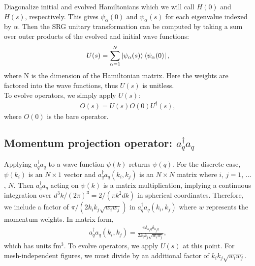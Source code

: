 \documentclass[preprintnumbers,floatfix,aps,prc,preprint,nofootinbib]{revtex4-1}
\begin{document}
Diagonalize initial and evolved Hamiltonians which we will call $H(0)$ and $H(s)$, respectively. This gives $\psi_{\alpha}(0)$ and $\psi_{\alpha}(s)$ for each eigenvalue indexed by $\alpha$. Then the SRG unitary transformation can be computed by taking a sum over outer products of the evolved and initial wave functions:
%
\begin{eqnarray}
	\label{eq:unitary_transformation}
	U(s) = \sum_{\alpha=1}^{N} \ket{\psi_{\alpha}(s)} \bra{\psi_{\alpha}(0)},
\end{eqnarray}
%
where N is the dimension of the Hamiltonian matrix. Here the weights are factored into the wave functions, thus $U(s)$ is unitless.
\\

To evolve operators, we simply apply $U(s)$:
%
\begin{eqnarray}
	\label{eq:evolved_operator}
	O(s) = U(s) O(0) U^{\dagger}(s),
\end{eqnarray}
%
where $O(0)$ is the bare operator.


\subsection{Momentum projection operator: $a^{\dagger}_q a_q$}
\label{sec:momentum_proj_operator}


Applying $a^{\dagger}_q a_q$ to a wave function $\psi(k)$ returns $\psi(q)$. For the discrete case, $\psi(k_i)$ is an $N \times 1$ vector and $a^{\dagger}_q a_q (k_i, k_j)$ is an $N \times N$ matrix where $i$, $j=1$, ... , $N$. Then $a^{\dagger}_q a_q$ acting on $\psi(k)$ is a matrix multiplication, implying a continuous integration over $d^3k / (2 \pi)^3 = 2 / (\pi k^2 dk)$ in spherical coordinates. Therefore, we include a factor of $\pi / (2 k_i k_j \sqrt{w_i w_j})$ in $a^{\dagger}_q a_q (k_i, k_j)$ where $w$ represents the momentum weights. In matrix form,
%
\begin{eqnarray}
	\label{eq:momentum_projection_operator}
	a^{\dagger}_q a_q (k_i, k_j) = \frac{\pi \delta_{k_i q} \delta_{k_j q}}{2 k_i k_j \sqrt{w_i w_j}},
\end{eqnarray}
%
which has units fm$^3$. To evolve operators, we apply $U(s)$ at this point. For mesh-independent figures, we must divide by an additional factor of $k_i k_j \sqrt{w_i w_j}$.


\end{document}
